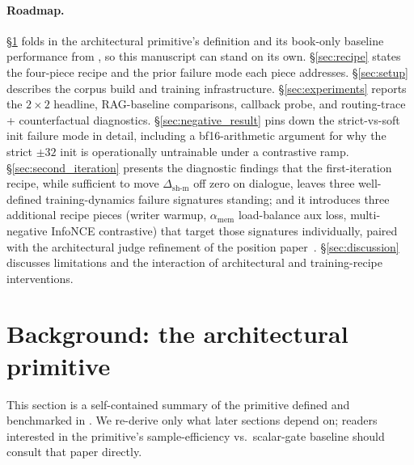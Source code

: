 \documentclass{article}
\newcommand{\dsh}{\Delta_{\text{sh-m}}}
\newcommand{\amem}{\alpha_{\text{mem}}}
\begin{document}
\paragraph{Roadmap.} \S\ref{sec:primitive} folds in the
architectural primitive's definition and its book-only baseline
performance from \cite{liu2025drop}, so this manuscript can stand
on its own. \S\ref{sec:recipe} states the four-piece recipe and
the prior failure mode each piece addresses. \S\ref{sec:setup}
describes the corpus build and training infrastructure.
\S\ref{sec:experiments} reports the $2\!\times\!2$ headline,
RAG-baseline comparisons, callback probe, and routing-trace +
counterfactual diagnostics. \S\ref{sec:negative_result} pins down
the strict-vs-soft init failure mode in detail, including a
bf16-arithmetic argument for why the strict $\pm 32$ init is
operationally untrainable under a contrastive ramp.
\S\ref{sec:second_iteration} presents the diagnostic findings that
the first-iteration recipe, while sufficient to move $\dsh$ off zero
on dialogue, leaves three well-defined training-dynamics failure
signatures standing; and it introduces three additional recipe
pieces (writer warmup, $\amem$ load-balance aux loss, multi-negative
InfoNCE contrastive) that target those signatures individually,
paired with the architectural judge refinement of the position
paper~\cite{liu2025memres}. \S\ref{sec:discussion} discusses
limitations and the interaction of architectural and training-recipe
interventions.

\section{Background: the architectural primitive}
\label{sec:primitive}

This section is a self-contained summary of the primitive defined
and benchmarked in \cite{liu2025drop}. We re-derive only what later
sections depend on; readers interested in the primitive's
sample-efficiency vs.\ scalar-gate baseline should consult that
paper directly.
\end{document}

